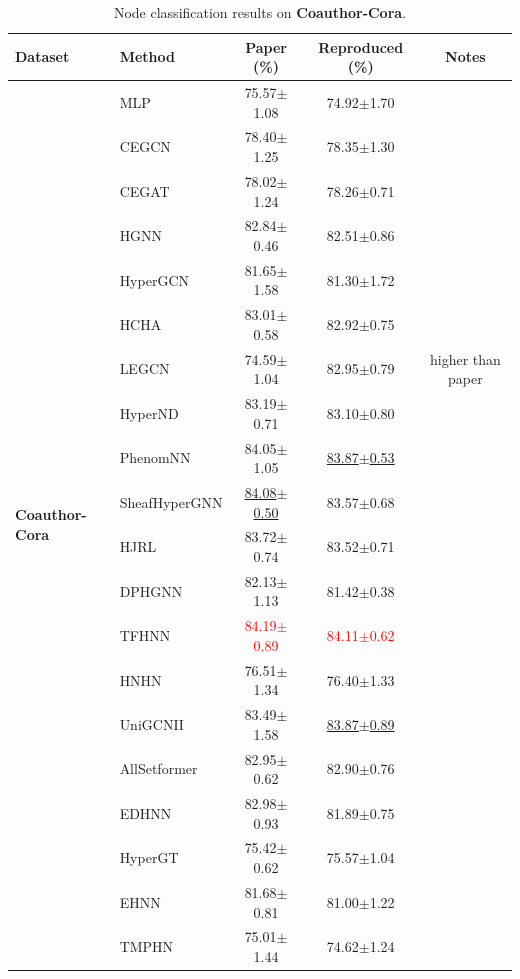\documentclass[11pt,a4paper]{article}
\begin{document}
\begin{table}[H]
	\centering\small
	\begin{tabular}{llccc}
		\toprule
		Dataset & Method & Paper (\%) & Reproduced (\%) & Notes \\
		\midrule
		\multirow{20}{*}{\textbf{Coauthor-Cora}} & MLP               & 75.57$\pm$1.08   & 74.92$\pm$1.70   &  \\
		 & CEGCN             & 78.40$\pm$1.25   & 78.35$\pm$1.30   &  \\
		 & CEGAT             & 78.02$\pm$1.24   & 78.26$\pm$0.71   &  \\
		 & HGNN              & 82.84$\pm$0.46   & 82.51$\pm$0.86   &  \\
		 & HyperGCN          & 81.65$\pm$1.58   & 81.30$\pm$1.72   &  \\
		 & HCHA              & 83.01$\pm$0.58   & 82.92$\pm$0.75   &  \\
		 & LEGCN             & 74.59$\pm$1.04   & 82.95$\pm$0.79   & higher than paper \\
		 & HyperND           & 83.19$\pm$0.71   & 83.10$\pm$0.80   &  \\
		 & PhenomNN          & 84.05$\pm$1.05   & \underline{83.87$\pm$0.53}   &  \\
		 & SheafHyperGNN     & \underline{84.08$\pm$0.50}   & 83.57$\pm$0.68   &  \\
		 & HJRL              & 83.72$\pm$0.74   & 83.52$\pm$0.71   &  \\
		 & DPHGNN            & 82.13$\pm$1.13   & 81.42$\pm$0.38   &  \\
		 & TFHNN             & \textcolor{red}{84.19$\pm$0.89}   & \textcolor{red}{84.11$\pm$0.62}   &  \\
		 & HNHN              & 76.51$\pm$1.34   & 76.40$\pm$1.33   &  \\
		 & UniGCNII          & 83.49$\pm$1.58   & \underline{83.87$\pm$0.89}   &  \\
		 & AllSetformer      & 82.95$\pm$0.62   & 82.90$\pm$0.76   &  \\
		 & EDHNN             & 82.98$\pm$0.93   & 81.89$\pm$0.75   &  \\
		 & HyperGT           & 75.42$\pm$0.62   & 75.57$\pm$1.04   &  \\
		 & EHNN              & 81.68$\pm$0.81   & 81.00$\pm$1.22   &  \\
		 & TMPHN             & 75.01$\pm$1.44   & 74.62$\pm$1.24   &  \\
		\bottomrule
	\end{tabular}
	\caption{Node classification results on \textbf{Coauthor-Cora}.}
\end{table}
\end{document}
